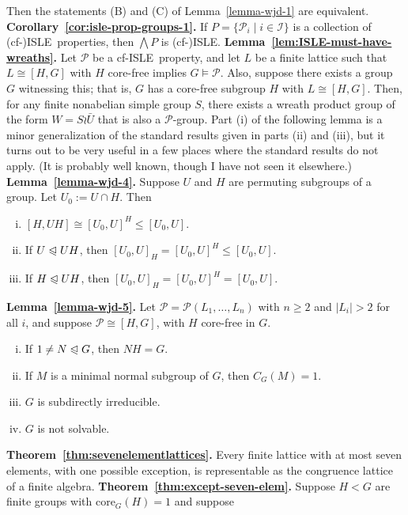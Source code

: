 \documentclass[cm,dissertation,actual,final]{uhthesis}
\theoremstyle{plain}
\theoremstyle{definition}
\theoremstyle{remark}
\numberwithin{theorem}{section}
\numberwithin{claim}{chapter}
\numberwithin{equation}{section}
\numberwithin{conjecture}{chapter}
\newcommand{\<}{\ensuremath{\langle}}
\renewcommand{\>}{\ensuremath{\rangle}}
\renewcommand{\leq}{\ensuremath{\leqslant}}
\renewcommand{\geq}{\ensuremath{\geqslant}}
\newcommand{\subnormal}{\ensuremath{\trianglelefteqslant}}
\newcommand{\Meet}{\ensuremath{\bigwedge}}
\newcommand{\core}{\ensuremath{\mathrm{core}}}
\newcommand{\0}{\ensuremath{\mathbf{0}}}
\newcommand{\1}{\ensuremath{\mathbf{1}}}
\newcommand{\2}{\ensuremath{\mathbf{2}}}
\newcommand{\3}{\ensuremath{\mathbf{3}}}
\newcommand{\4}{\ensuremath{\mathbf{4}}}
\newcommand{\5}{\ensuremath{\mathbf{5}}}
\newcommand{\sI}{\ensuremath{\mathscr{I}}}
\newcommand{\sP}{\ensuremath{\mathscr{P}}}
\newcommand{\cP}{\ensuremath{\mathcal{P}}}
\newcommand{\ISLE}{{\small ISLE}}
\begin{document}
Then the statements (B) and (C) of Lemma~\ref{lemma-wjd-1} are equivalent.
\vskip4mm \noindent
{\bf Corollary~\ref{cor:isle-prop-groups-1}.}
  If $P = \{\cP_i \mid i\in \sI\}$ is a collection of (cf-)\ISLE\ properties,
  then $\Meet P$ is (cf-)\ISLE.
\vskip4mm \noindent
{\bf Lemma~\ref{lem:ISLE-must-have-wreaths}.}
Let $\cP$ be a cf-\ISLE\ property, and let $L$ be a finite lattice such that 
$L\cong [H,G]$ with $H$ core-free implies $G\vDash \cP$.  Also, suppose there
exists a group $G$ witnessing this; that is, $G$ has a core-free subgroup
$H$ with $L\cong [H,G]$.   
Then, for any finite nonabelian simple group $S$, there exists a wreath product group
of the form $W = S\wr \bar{U}$ that is also a $\cP$-group.
\vskip4mm \noindent
Part (i) of the following lemma is a minor generalization of the standard results
given in parts (ii) and (iii), but it turns out
to be very useful in a few places where the standard results do not apply.
(It is probably well known, though I have not seen it elsewhere.)
\vskip4mm \noindent
{\bf Lemma~\ref{lemma-wjd-4}.}
Suppose $U$ and $H$ are permuting subgroups of a group. %
Let $U_0 := U\cap H$.  Then
\begin{enumerate}[(i)]
\item $[H, UH]  \cong  [U_0, U]^H \leq [U_0, U]$.
\item If $U \subnormal UH$, then  $[U_0, U]_H  = [U_0, U]^H \leq [U_0, U]$.
\item If $H \subnormal UH$,  then  $[U_0, U]_H  = [U_0, U]^H = [U_0, U]$.
\end{enumerate}
\vskip4mm \noindent
{\bf Lemma~\ref{lemma-wjd-5}.}
 Let $\sP = \sP(L_1, \dots, L_n)$ with $n\geq 2$ and $|L_i|>2$ for all
$i$, and suppose $\sP \cong [H, G]$, with $H$ core-free in $G$.  
\begin{enumerate}[(i)]
\item If $1\neq N \subnormal G$, then $NH = G$.
\item If $M$ is a minimal normal subgroup of $G$, then $C_G(M)=1$.
\item $G$ is subdirectly irreducible.
\item $G$ is not solvable.
\end{enumerate}
\vskip4mm \noindent
{\bf Theorem~\ref{thm:sevenelementlattices}.}
  Every finite lattice with at most seven elements, with one possible exception,
  is representable as the congruence lattice of a finite algebra.
\vskip4mm \noindent
{\bf Theorem~\ref{thm:except-seven-elem}.}
Suppose $H<G$ are finite groups with $\core_G(H) = 1$ and suppose
\end{document}
